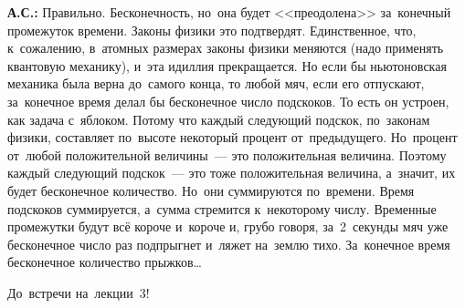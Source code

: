 \textbf{А.С.:} Правильно. Бесконечность, но~она будет <<преодолена>> за~конечный промежуток времени. Законы физики
это подтвердят. Единственное, что, к~сожалению, в~атомных размерах законы физики меняются (надо
применять квантовую механику), и~эта идиллия прекращается. Но если бы ньютоновская механика была
верна до~самого конца, то любой мяч, если его отпускают, за~конечное время делал бы бесконечное
число подскоков. То есть он устроен, как задача с~яблоком. Потому что каждый следующий подскок,
по~законам физики, составляет по~высоте некоторый процент от~предыдущего. Но~процент от~любой
положительной величины~--- это положительная величина. Поэтому каждый следующий подскок~--- это
тоже положительная величина, а~значит, их будет бесконечное количество.
 Но~они суммируются по~времени.
Время подскоков суммируется, а~сумма стремится к~некоторому числу. Временные промежутки будут всё
короче и~короче и, грубо говоря, за~2~секунды мяч уже бесконечное число раз подпрыгнет и~ляжет
на~землю тихо. За~конечное время бесконечное количество прыжков\ldots

До~встречи на~лекции~3!

\endinput
